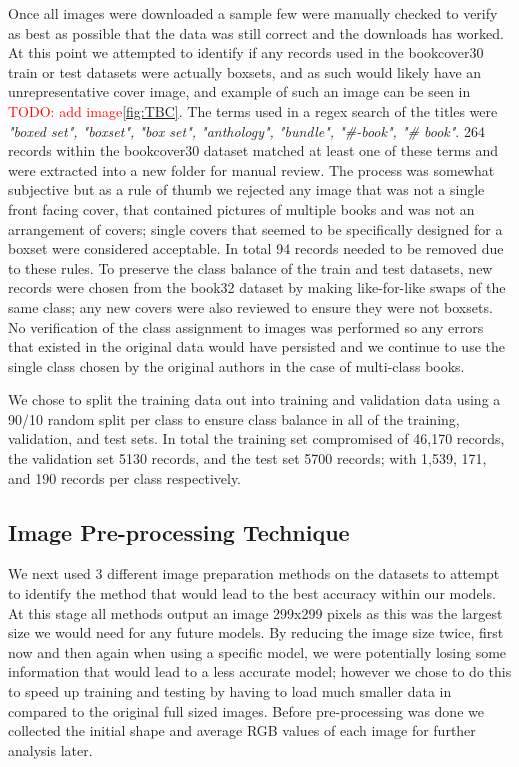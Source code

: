 \documentclass[12pt]{article}
\numberwithin{equation}{section}
\numberwithin{figure}{section}
\begin{document}
Once all images were downloaded a sample few were manually checked to verify as best as possible that the data was still correct and the downloads has worked. At this point we attempted to identify if any records used in the bookcover30 train or test datasets were actually boxsets, and as such would likely have an unrepresentative cover image, and example of such an image can be seen in \textcolor{red}{TODO: add image}\cref{fig:TBC}. The terms used in a regex search of the titles were \emph{"boxed set", "boxset", "box set", "anthology", "bundle", "\#-book", "\# book"}. 264 records within the bookcover30 dataset matched at least one of these terms and were extracted into a new folder for manual review. The process was somewhat subjective but as a rule of thumb we rejected any image that was not a single front facing cover, that contained pictures of multiple books and was not an arrangement of covers; single covers that seemed to be specifically designed for a boxset were considered acceptable. In total 94 records needed to be removed due to these rules. To preserve the class balance of the train and test datasets, new records were chosen from the book32 dataset by making like-for-like swaps of the same class; any new covers were also reviewed to ensure they were not boxsets. No verification of the class assignment to images was performed so any errors that existed in the original data would have persisted and we continue to use the single class chosen by the original authors in the case of multi-class books.

We chose to split the training data out into training and validation data using a 90/10 random split per class to ensure class balance in all of the training, validation, and test sets. In total the training set compromised of 46,170 records, the validation set 5130 records, and the test set 5700 records; with 1,539, 171, and 190 records per class respectively. 

\subsection{Image Pre-processing Technique} 
\label{sub:Image_Pre-processing_Technique} 

We next used 3 different image preparation methods on the datasets to attempt to identify the method that would lead to the best accuracy within our models. At this stage all methods output an image 299x299 pixels as this was the largest size we would need for any future models. By reducing the image size twice, first now and then again when using a specific model, we were potentially losing some information that would lead to a less accurate model; however we chose to do this to speed up training and testing by having to load much smaller data in compared to the original full sized images. Before pre-processing was done we collected the initial shape and average RGB values of each image for further analysis later.
\end{document}

